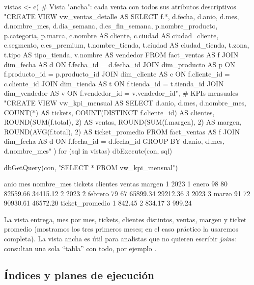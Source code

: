 \begin{rcode}
vistas <- c(
  # Vista "ancha": cada venta con todos sus atributos descriptivos
  "CREATE VIEW vw_ventas_detalle AS
   SELECT f.*, d.fecha, d.anio, d.mes, d.nombre_mes, d.dia_semana,
          d.es_fin_semana, p.nombre_producto, p.categoria, p.marca,
          c.nombre AS cliente, c.ciudad AS ciudad_cliente, c.segmento,
          c.es_premium, t.nombre_tienda, t.ciudad AS ciudad_tienda,
          t.zona, t.tipo AS tipo_tienda, v.nombre AS vendedor
   FROM fact_ventas AS f
   JOIN dim_fecha    AS d ON f.fecha_id    = d.fecha_id
   JOIN dim_producto AS p ON f.producto_id = p.producto_id
   JOIN dim_cliente  AS c ON f.cliente_id  = c.cliente_id
   JOIN dim_tienda   AS t ON f.tienda_id   = t.tienda_id
   JOIN dim_vendedor AS v ON f.vendedor_id = v.vendedor_id",
  # KPIs mensuales
  "CREATE VIEW vw_kpi_mensual AS
   SELECT d.anio, d.mes, d.nombre_mes,
          COUNT(*)                     AS tickets,
          COUNT(DISTINCT f.cliente_id) AS clientes,
          ROUND(SUM(f.total), 2)       AS ventas,
          ROUND(SUM(f.margen), 2)      AS margen,
          ROUND(AVG(f.total), 2)       AS ticket_promedio
   FROM fact_ventas AS f
   JOIN dim_fecha AS d ON f.fecha_id = d.fecha_id
   GROUP BY d.anio, d.mes, d.nombre_mes"
)
for (sql in vistas) dbExecute(con, sql)

dbGetQuery(con, "SELECT * FROM vw_kpi_mensual") %
\end{rcode}

\begin{rsalida}
  anio mes nombre_mes tickets clientes   ventas   margen
1 2023   1      enero      98       80 82559.66 34415.12
2 2023   2    febrero      79       67 65899.34 29212.36
3 2023   3      marzo      91       72 90930.61 46572.20
  ticket_promedio
1          842.45
2          834.17
3          999.24
\end{rsalida}

La vista entrega, mes por mes, tickets, clientes distintos, ventas, margen
y ticket promedio (mostramos los tres primeros meses; en el caso práctico
la usaremos completa). La vista ancha  es
útil para analistas que no quieren escribir \emph{joins}: consultan una sola
``tabla'' con todo, por ejemplo
.

\subsection{Índices y planes de ejecución}

